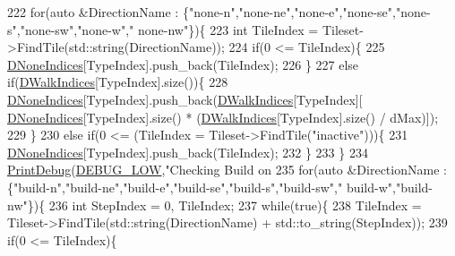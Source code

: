 \begin{DoxyCode}
{{{{{{{222             \textcolor{keywordflow}{for}(\textcolor{keyword}{auto} &DirectionName : \{\textcolor{stringliteral}{"none-n"},\textcolor{stringliteral}{"none-ne"},\textcolor{stringliteral}{"none-e"},\textcolor{stringliteral}{"none-se"},\textcolor{stringliteral}{"none-s"},\textcolor{stringliteral}{"none-sw"},\textcolor{stringliteral}{"none-w"},\textcolor{stringliteral}{"
      none-nw"}\})\{
223                 \textcolor{keywordtype}{int} TileIndex = Tileset->FindTile(std::string(DirectionName));
224                 \textcolor{keywordflow}{if}(0 <= TileIndex)\{
225                     \hyperlink{classCAssetRenderer_adfa7285e46e798a7d34a935bc7a6df6c}{DNoneIndices}[TypeIndex].push\_back(TileIndex);
226                 \}
227                 \textcolor{keywordflow}{else} \textcolor{keywordflow}{if}(\hyperlink{classCAssetRenderer_a9975fd583c826c9905ccd080659bd3c5}{DWalkIndices}[TypeIndex].size())\{
228                     \hyperlink{classCAssetRenderer_adfa7285e46e798a7d34a935bc7a6df6c}{DNoneIndices}[TypeIndex].push\_back(\hyperlink{classCAssetRenderer_a9975fd583c826c9905ccd080659bd3c5}{DWalkIndices}[TypeIndex][
      \hyperlink{classCAssetRenderer_adfa7285e46e798a7d34a935bc7a6df6c}{DNoneIndices}[TypeIndex].size() * (\hyperlink{classCAssetRenderer_a9975fd583c826c9905ccd080659bd3c5}{DWalkIndices}[TypeIndex].size() / dMax)]);
229                 \}
230                 \textcolor{keywordflow}{else} \textcolor{keywordflow}{if}(0 <= (TileIndex = Tileset->FindTile(\textcolor{stringliteral}{"inactive"})))\{
231                     \hyperlink{classCAssetRenderer_adfa7285e46e798a7d34a935bc7a6df6c}{DNoneIndices}[TypeIndex].push\_back(TileIndex);
232                 \}
233             \}
234             \hyperlink{Debug_8h_aa5f00f5537c9760f6ae1782460748ab9}{PrintDebug}(\hyperlink{Debug_8h_a3a5f3fc09784650d8388cb854882f840}{DEBUG\_LOW},\textcolor{stringliteral}{"Checking Build on %
235             \textcolor{keywordflow}{for}(\textcolor{keyword}{auto} &DirectionName : \{\textcolor{stringliteral}{"build-n"},\textcolor{stringliteral}{"build-ne"},\textcolor{stringliteral}{"build-e"},\textcolor{stringliteral}{"build-se"},\textcolor{stringliteral}{"build-s"},\textcolor{stringliteral}{"build-sw"},\textcolor{stringliteral}{"
      build-w"},\textcolor{stringliteral}{"build-nw"}\})\{
236                 \textcolor{keywordtype}{int} StepIndex = 0, TileIndex;
237                 \textcolor{keywordflow}{while}(\textcolor{keyword}{true})\{
238                     TileIndex = Tileset->FindTile(std::string(DirectionName) + std::to\_string(StepIndex));
239                     \textcolor{keywordflow}{if}(0 <= TileIndex)\{
}}}}}}}}
\end{DoxyCode}
